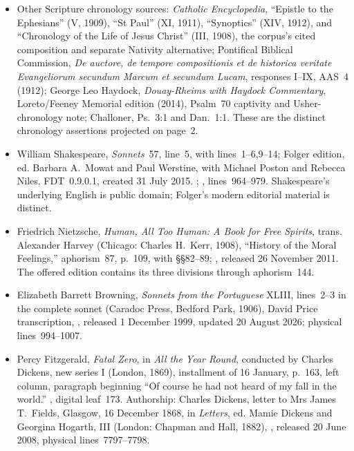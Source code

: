 {\begin{itemize}[leftmargin=1.1em,itemsep=0.3em,parsep=0pt]
\item Other Scripture chronology sources: \textit{Catholic Encyclopedia}, ``Epistle to the Ephesians'' (V, 1909), ``St Paul'' (XI, 1911), ``Synoptics'' (XIV, 1912), and ``Chronology of the Life of Jesus Christ'' (III, 1908), the corpus's cited composition and separate Nativity alternative; Pontifical Biblical Commission, \textit{De auctore, de tempore compositionis et de historica veritate Evangeliorum secundum Marcum et secundum Lucam}, responses I--IX, AAS~4 (1912); George Leo Haydock, \textit{Douay-Rheims with Haydock Commentary}, Loreto/Feeney Memorial edition (2014), Psalm~70 captivity and Usher-chronology note; Challoner, Ps.~3:1 and Dan.~1:1. These are the distinct chronology assertions projected on page~2.
\item William Shakespeare, \textit{Sonnets}~57, line~5, with lines~1--6,9--14; Folger edition, ed. Barbara A.~Mowat and Paul Werstine, with Michael Poston and Rebecca Niles, FDT~0.9.0.1, created 31 July 2015. ; , lines~964--979. Shakespeare's underlying English is public domain; Folger's modern editorial material is distinct.
\item Friedrich Nietzsche, \textit{Human, All Too Human: A Book for Free Spirits}, trans. Alexander Harvey (Chicago: Charles H.~Kerr, 1908), ``History of the Moral Feelings,'' aphorism~87, p.~109, with §§82--89; , released 26 November 2011. The offered edition contains its three divisions through aphorism~144.
\item Elizabeth Barrett Browning, \textit{Sonnets from the Portuguese} XLIII, lines~2--3 in the complete sonnet (Caradoc Press, Bedford Park, 1906), David Price transcription, , released 1 December 1999, updated 20 August 2026; physical lines~994--1007.
\item Percy Fitzgerald, \textit{Fatal Zero}, in \textit{All the Year Round}, conducted by Charles Dickens, new series I (London, 1869), installment of 16 January, p.~163, left column, paragraph beginning ``Of course he had not heard of my fall in the world.'' , digital leaf~173. Authorship: Charles Dickens, letter to Mrs James T.~Fields, Glasgow, 16 December 1868, in \textit{Letters}, ed. Mamie Dickens and Georgina Hogarth, III (London: Chapman and Hall, 1882), , released 20 June 2008, physical lines~7797--7798.

\end{itemize}}
